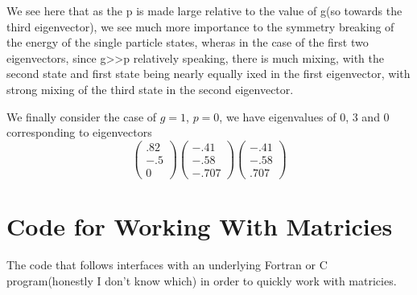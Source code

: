 \documentclass[11pt]{article} %
\begin{document}
We see here that as the p is made large relative to the value of g(so towards the third eigenvector), we see much more importance to the symmetry breaking of the energy of the single particle states, wheras in the case of the first two eigenvectors, since g>>p relatively speaking, there is much mixing, with the second state and first state being nearly equally ixed in the first eigenvector, with strong mixing of the third state in the second eigenvector. 


We finally consider the case of $g=1$, $p=0$, we have eigenvalues of $0$, $3$ and $0$ corresponding to eigenvectors\\

\begin{equation}
\left( \begin{matrix} .82 \\ -.5 \\0 \end{matrix} \right)
\left( \begin{matrix} -.41 \\ -.58 \\ -.707 \end{matrix} \right)
\left( \begin{matrix} -.41 \\ -.58 \\ .707 \end{matrix} \right)
\end{equation}

\section{Code for Working With Matricies}

The code that follows interfaces with an underlying Fortran or C program(honestly I don't know which) in order to quickly work with matricies.



\end{document}
